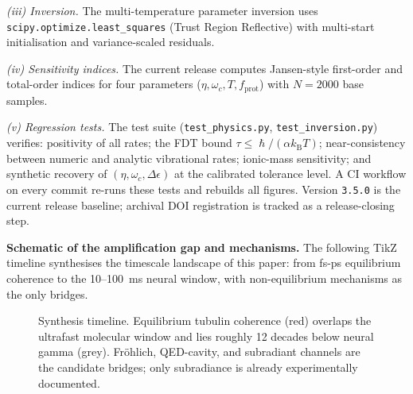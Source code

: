 \documentclass[twocolumn,10pt]{article}
\renewcommand{\hbar}{\hslash}
\newcommand{\kB}{k_{\text{B}}}
\begin{document}
\emph{(iii) Inversion.} The multi-temperature parameter inversion uses
\texttt{scipy.optimize.least\_squares} (Trust Region Reflective) with
multi-start initialisation and variance-scaled residuals.

\emph{(iv) Sensitivity indices.} The current release computes Jansen-style
first-order and total-order indices for four parameters
($\eta,\omega_c,T,f_{\text{prot}}$) with $N=2000$ base samples.

\emph{(v) Regression tests.} The test suite
(\texttt{test\_physics.py}, \texttt{test\_inversion.py}) verifies: positivity
of all rates; the FDT bound $\tau\le\hbar/(\alpha\kB T)$; near-consistency
between numeric and analytic vibrational rates; ionic-mass sensitivity; and
synthetic recovery of $(\eta,\omega_c,\Delta\epsilon)$ at the calibrated
tolerance level. A CI workflow on
every commit re-runs these tests and rebuilds all figures. Version
\texttt{3.5.0} is the current release baseline; archival DOI registration
is tracked as a release-closing step.



\noindent\textbf{Schematic of the amplification gap and mechanisms.}
The following TikZ timeline synthesises the timescale landscape of this
paper: from fs-ps equilibrium coherence to the 10--100~ms neural window,
with non-equilibrium mechanisms as the only bridges.

\begin{figure}[t]
\centering
{}
\caption{Synthesis timeline. Equilibrium tubulin coherence (red) overlaps
the ultrafast molecular window and lies roughly 12 decades below neural gamma (grey).
Fr\"ohlich, QED-cavity, and subradiant channels are the candidate
bridges; only subradiance is already experimentally documented.}
\label{fig:timeline}
\end{figure}
\end{document}
